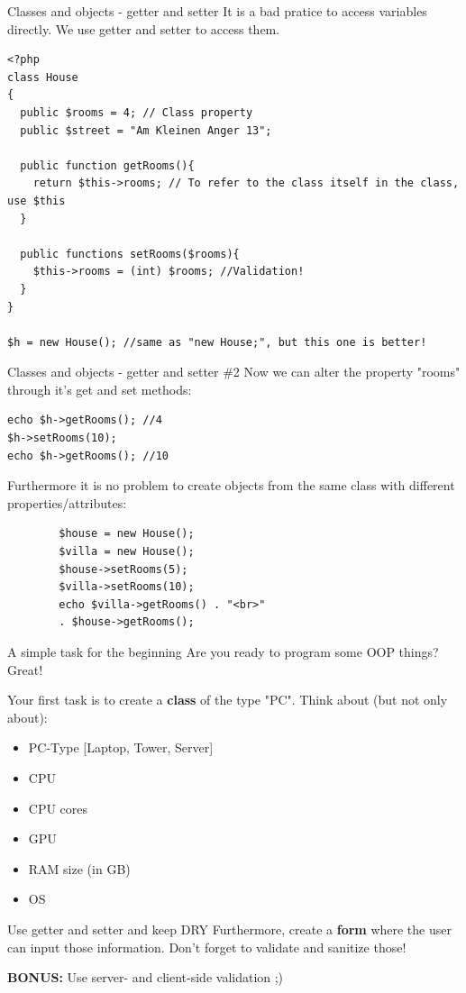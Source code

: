 \begin{frame}[fragile]{Classes and objects - getter and setter}
	It is a bad pratice to access variables directly. We use getter and setter to access them. \pause
	\begin{lstlisting}
<?php
class House
{
  public $rooms = 4; // Class property
  public $street = "Am Kleinen Anger 13";
  
  public function getRooms(){
  	return $this->rooms; // To refer to the class itself in the class, use $this
  }
  
  public functions setRooms($rooms){
  	$this->rooms = (int) $rooms; //Validation!
  }
}

$h = new House(); //same as "new House;", but this one is better!
\end{lstlisting}
\end{frame}

\begin{frame}[fragile]{Classes and objects - getter and setter \#{}2}
	Now we can alter the property "rooms" through it's get and set methods:\pause
	\begin{lstlisting}
echo $h->getRooms(); //4
$h->setRooms(10);
echo $h->getRooms(); //10
\end{lstlisting}\pause
	Furthermore it is no problem to create objects from the same class with different properties/attributes:\pause
		\begin{lstlisting}
		$house = new House();
		$villa = new House();
		$house->setRooms(5);
		$villa->setRooms(10);
		echo $villa->getRooms() . "<br>" 
		. $house->getRooms();
		\end{lstlisting}
\end{frame}

\begin{frame}[fragile]{A simple task for the beginning}
	Are you ready to program some OOP things? Great! \pause
	
	Your first task is to create a \textbf{class} of the type "PC". Think about (but not only about): 
	\begin{itemize}
	\item PC-Type [Laptop, Tower, Server] \pause
	\item CPU \pause
	\item CPU cores \pause
	\item GPU \pause
	\item RAM size (in GB) \pause
	\item OS \pause
	\end{itemize}
	
	Use getter and setter and keep DRY \pause
	Furthermore, create a \textbf{form} where the user can input those information. Don't forget to validate and sanitize those! \pause
	
	\textbf{BONUS:} Use server- and client-side validation ;)
\end{frame}

